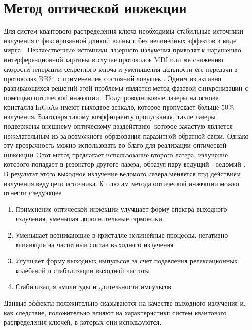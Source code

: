 \section{Метод оптической инжекции}\label{sec:ch2/sect1}
Для систем квантового распределения ключа необходимы стабильные источники излучения с фиксированной длиной волны и без нелинейных эффектов в виде чирпа \cite{yuan2016, roberts2018}. Некачественные источники лазерного излучения приводят к нарушению интерференционной  картины в случае протоколов MDI \cite{comandar2016} или же снижению скорости генерации секретного ключа и уменьшения дальности его передачи в протоколах BB84 с применением состояний ловушек \cite{xie2019}. Одним из активно развивающихся решений этой проблемы является метод фазовой синхронизации с помощью оптической инжекции \cite{liu2020}. 
\newline Полупроводниковые лазеры  на основе кристалла InGaAs имеют выходное зеркало, которое пропускает больше 50\% излучения. Благодаря такому коэффициенту пропускания, такие лазеры подвержены внешнему оптическому воздействию, которое зачастую является нежелательным из-за возможного образования паразитной обратной связи. Однако эту прозрачность можно использовать во благо для реализации оптической инжекции. Этот метод предлагает использование второго лазера, излучение которого попадает в резонатор другого лазера, образуя пару ведущий - ведомый \cite{shakhovoy2024}. В результат этого выходное излучение ведомого лазера меняется под действием излучения ведущего источника. К плюсам метода оптической инжекции можно отнести следующее
\begin{enumerate}
    \item Применение оптической инжекции улучшает форму спектра выходного излучения, уменьшая дополнительные гармоники.
    \item Уменьшает возникающие в кристалле нелинейные процессы, негативно влияющие на частотный состав выходного излучения
    \item Улучшает форму выходных импульсов за счет подавления релаксационных колебаний и стабилизации выходной частоты
    \item Стабилизация амплитуды и длительности импульсов
\end{enumerate}
Данные эффекты положительно сказываются на качестве выходного излучения и, как следствие, положительно влияют на характеристики систем квантового распределения ключей, в которых они используются.
